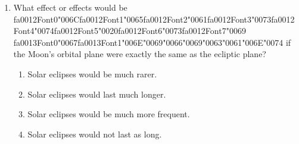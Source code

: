 \documentclass[12pt]{article}
\begin{document}
\begin{enumerate}[label=\arabic*.]
\begin{enumerate}[label=(\alph*)]
    \item Asteroids emit pulsed radiation
    \item Asteroids emit a lot of their own radiation
    \item They reflect enough of the sun's light to make them brighter than most background stars
    \item Asteroids have substantial motion relative to the background stars
\end{enumerate}
\item What effect or effects would be {\csname fa0012Font0\endcsname\char"006C}{\csname fa0012Font1\endcsname\char"0065}{\csname fa0012Font2\endcsname\char"0061}{\csname fa0012Font3\endcsname\char"0073}{\csname fa0012Font4\endcsname\char"0074}{\csname fa0012Font5\endcsname\char"0020}{\csname fa0012Font6\endcsname\char"0073}{\csname fa0012Font7\endcsname\char"0069} {\csname fa0013Font0\endcsname\char"0067}{\csname fa0013Font1\endcsname\char"006E}{\char"0069}{\char"0066}{\char"0069}{\char"0063}{\char"0061}{\char"006E}{\char"0074} if the Moon's orbital plane were exactly
the same as the ecliptic plane?
\begin{enumerate}[label=(\alph*)]
    \item Solar eclipses would be much rarer.
    \item Solar eclipses would last much longer.
    \item Solar eclipses would be much more frequent.
    \item Solar eclipses would not last as long.
\end{enumerate}
\end{enumerate}
\end{document}

